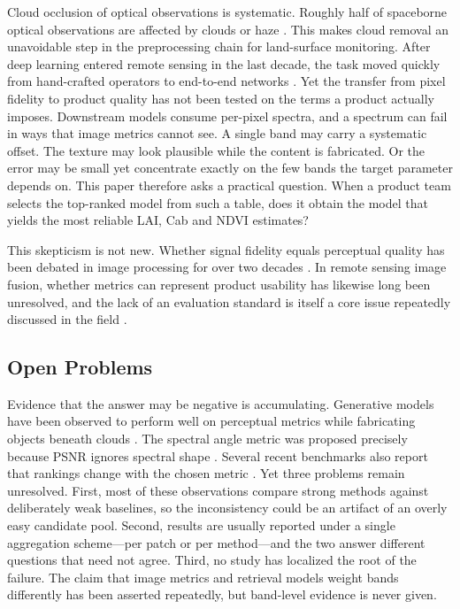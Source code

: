 \documentclass[a4paper,fleqn]{cas-dc}
\begin{document}
Cloud occlusion of optical observations is systematic. Roughly half of spaceborne optical observations are affected by clouds or haze \cite{ref1}. This makes cloud removal an unavoidable step in the preprocessing chain for land-surface monitoring. After deep learning entered remote sensing in the last decade, the task moved quickly from hand-crafted operators to end-to-end networks \cite{ref2}. Yet the transfer from pixel fidelity to product quality has not been tested on the terms a product actually imposes. Downstream models consume per-pixel spectra, and a spectrum can fail in ways that image metrics cannot see. A single band may carry a systematic offset. The texture may look plausible while the content is fabricated. Or the error may be small yet concentrate exactly on the few bands the target parameter depends on. This paper therefore asks a practical question. When a product team selects the top-ranked model from such a table, does it obtain the model that yields the most reliable LAI, Cab and NDVI estimates?

This skepticism is not new. Whether signal fidelity equals perceptual quality has been debated in image processing for over two decades \cite{ref3,ref4}. In remote sensing image fusion, whether metrics can represent product usability has likewise long been unresolved, and the lack of an evaluation standard is itself a core issue repeatedly discussed in the field \cite{ref5,ref6}.

\subsection{Open Problems}

Evidence that the answer may be negative is accumulating. Generative models have been observed to perform well on perceptual metrics while fabricating objects beneath clouds \cite{ref7,ref8}. The spectral angle metric was proposed precisely because PSNR ignores spectral shape \cite{ref9}. Several recent benchmarks also report that rankings change with the chosen metric \cite{ref10,ref11}. Yet three problems remain unresolved. First, most of these observations compare strong methods against deliberately weak baselines, so the inconsistency could be an artifact of an overly easy candidate pool. Second, results are usually reported under a single aggregation scheme---per patch or per method---and the two answer different questions that need not agree. Third, no study has localized the root of the failure. The claim that image metrics and retrieval models weight bands differently has been asserted repeatedly, but band-level evidence is never given.
\end{document}
